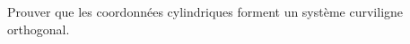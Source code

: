 
\begin{exercice}\label{exoOutilsMath-0078}

    Prouver que les coordonnées cylindriques forment un système curviligne orthogonal.

\end{exercice}
